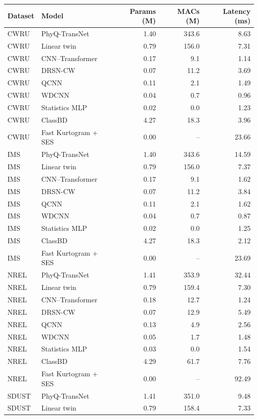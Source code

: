 \begin{tabular}{llrrr}
\toprule
Dataset & Model & Params (M) & MACs (M) & Latency (ms) \\
\midrule
CWRU & PhyQ-TransNet & 1.40 & 343.6 & 8.63 \\
CWRU & Linear twin & 0.79 & 156.0 & 7.31 \\
CWRU & CNN--Transformer & 0.17 & 9.1 & 1.14 \\
CWRU & DRSN-CW & 0.07 & 11.2 & 3.69 \\
CWRU & QCNN & 0.11 & 2.1 & 1.49 \\
CWRU & WDCNN & 0.04 & 0.7 & 0.96 \\
CWRU & Statistics MLP & 0.02 & 0.0 & 1.23 \\
CWRU & ClassBD & 4.27 & 18.3 & 3.96 \\
CWRU & Fast Kurtogram + SES & 0.00 & -- & 23.66 \\
IMS & PhyQ-TransNet & 1.40 & 343.6 & 14.59 \\
IMS & Linear twin & 0.79 & 156.0 & 7.37 \\
IMS & CNN--Transformer & 0.17 & 9.1 & 1.62 \\
IMS & DRSN-CW & 0.07 & 11.2 & 3.84 \\
IMS & QCNN & 0.11 & 2.1 & 1.62 \\
IMS & WDCNN & 0.04 & 0.7 & 0.87 \\
IMS & Statistics MLP & 0.02 & 0.0 & 1.25 \\
IMS & ClassBD & 4.27 & 18.3 & 2.12 \\
IMS & Fast Kurtogram + SES & 0.00 & -- & 23.69 \\
NREL & PhyQ-TransNet & 1.41 & 353.9 & 32.44 \\
NREL & Linear twin & 0.79 & 159.4 & 7.30 \\
NREL & CNN--Transformer & 0.18 & 12.7 & 1.24 \\
NREL & DRSN-CW & 0.07 & 12.9 & 5.49 \\
NREL & QCNN & 0.13 & 4.9 & 2.56 \\
NREL & WDCNN & 0.05 & 1.7 & 1.48 \\
NREL & Statistics MLP & 0.03 & 0.0 & 1.54 \\
NREL & ClassBD & 4.29 & 61.7 & 7.76 \\
NREL & Fast Kurtogram + SES & 0.00 & -- & 92.49 \\
SDUST & PhyQ-TransNet & 1.41 & 351.0 & 9.48 \\
SDUST & Linear twin & 0.79 & 158.4 & 7.33 \\

\end{tabular}
